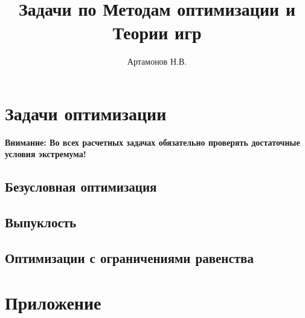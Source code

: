 \documentclass[12pt]{article}
\title{Задачи по Методам оптимизации и Теории игр}
\author{Артамонов Н.В.}
\theoremstyle{remark}
\begin{document}
\maketitle

\tableofcontents

\section{Задачи оптимизации}

\textbf{Внимание: Во всех расчетных задачах обязательно проверять достаточные условия экстремума!}

\subsection{Безусловная оптимизация}



\subsection{Выпуклость}



\subsection{Оптимизации с ограничениями  равенства}



\appendix

\section{Приложение}


\end{document}
